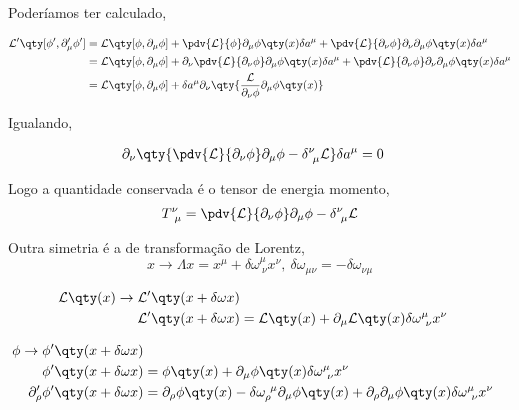 \documentclass[twoside]{amsart}
\numberwithin{equation}{section}
\begin{document}
Poderíamos ter calculado,

\begin{align}
    \mathcal L'\qty[\phi',\partial_\mu'\phi ']&=\mathcal L\qty[\phi,\partial_\mu\phi]+\pdv{\mathcal L}{\phi}\partial_\mu\phi\qty(x)\delta a^\mu
    +\pdv{\mathcal L}{\partial_\nu\phi}\partial_\nu\partial_\mu\phi\qty(x)\delta a^\mu\\
    &=\mathcal L\qty[\phi,\partial_\mu\phi]+\partial_\nu\pdv{\mathcal L}{\partial_\nu\phi}\partial_\mu\phi\qty(x)\delta a^\mu+
    \pdv{\mathcal L}{\partial_\nu\phi}\partial_\nu\partial_\mu\phi\qty(x)\delta a^\mu\\
    &=\mathcal L\qty[\phi,\partial_\mu\phi]+\delta a^\mu\partial_\nu\qty{\frac{\mathcal L}{\partial_\nu\phi}\partial_\mu\phi\qty(x)}
\end{align}

Igualando,

\begin{align}
    \partial_\nu\qty{\pdv{\mathcal L}{\partial_\nu\phi}\partial_\mu\phi-\delta^\nu_{\ \mu}\mathcal L}\delta a^\mu&=0
\end{align}

Logo a quantidade conservada é o tensor de energia momento, $$T^\nu_{\ \mu}=\pdv{\mathcal L}{\partial_\nu\phi}\partial_\mu\phi-\delta^\nu_{\ \mu}\mathcal L$$

Outra simetria é a de transformação de Lorentz, $$x\rightarrow \Lambda x=x^\mu+\delta\omega^\mu_{\ \nu}x^\nu,\ \delta\omega_{\mu\nu}=-\delta\omega_{\nu\mu}$$

\begin{align}
    \mathcal L\qty(x)\rightarrow\mathcal L'\qty(x+\delta\omega x)\\
    \mathcal L'\qty(x+\delta\omega x)&=\mathcal L\qty(x)+\partial_\mu\mathcal L\qty(x)\delta\omega^\mu_{\ \nu}x^\nu
\end{align}

\begin{align}
    \phi\rightarrow\phi'\qty(x+\delta\omega x)\\
    \phi'\qty(x+\delta\omega x)&=\phi\qty(x)+\partial_\mu\phi\qty(x)\delta\omega^{\mu}_{\ \nu}x^\nu\\
    \partial_\rho'\phi'\qty(x+\delta\omega x)&=\partial_\rho\phi\qty(x)-\delta\omega_{\rho}^{\ \mu}\partial_\mu\phi\qty(x)+\partial_\rho\partial_\mu\phi\qty(x)\delta\omega^{\mu}_{\ \nu}x^\nu
\end{align}
\end{document}

